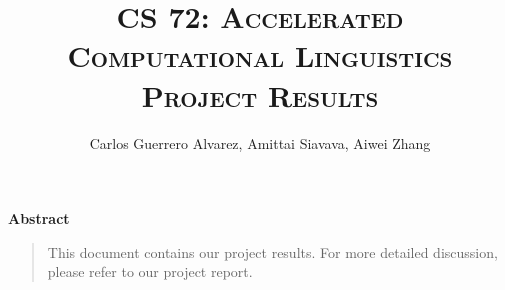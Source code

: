 \title{
  \Huge{\textsc{CS 72: Accelerated Computational Linguistics}}\\
  \small{\textsc{Project Results}}
}

\date{\Large{}}

\begin{titlingpage}

  \author{
    \Large{Carlos Guerrero Alvarez},
    \Large{Amittai Siavava},
    \Large{Aiwei Zhang}
  }
  \maketitle

  \begin{center} \textbf{Abstract} \end{center}

  
  \begin{quote}
    \small
    
    This document contains our project results.
    For more detailed discussion, please refer to our project report.
  \end{quote}

  \tableofcontents
  
\end{titlingpage}

